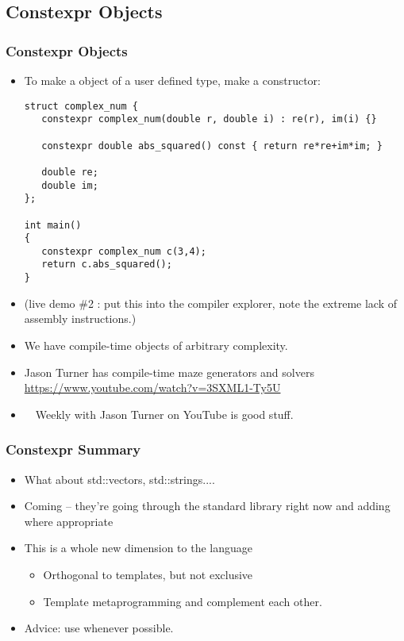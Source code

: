 \subsection{Constexpr Objects}
\begin{frame}[fragile,t]
\frametitle{Constexpr Objects}
\begin{itemize}[<+->]
\item To make a \cexpr object of a user defined type, make a 
  \cexpr constructor:
{\scriptsize\begin{Verbatim}
struct complex_num {
   constexpr complex_num(double r, double i) : re(r), im(i) {}

   constexpr double abs_squared() const { return re*re+im*im; }
  
   double re;
   double im;   
};

int main()
{
   constexpr complex_num c(3,4);
   return c.abs_squared();
}
\end{Verbatim}
}
\item (live demo \#2 : put this into the compiler explorer, note the
  extreme lack of assembly instructions.)
\item We have compile-time objects of arbitrary complexity.
\item Jason Turner has  compile-time maze generators and solvers \Emph{(!)}
\url{https://www.youtube.com/watch?v=3SXML1-Ty5U}
\item[] \ \CC\ Weekly with Jason Turner on YouTube is good stuff.
\end{itemize}
\end{frame}


\begin{frame}[fragile,t]
\frametitle{Constexpr Summary}
\begin{itemize}[<+->]
\item What about \cexpr std::vectors, std::strings....
\item Coming -- they're going through the standard library right now
  and adding \cexpr where appropriate
\item This is a whole new dimension to the language
\begin{itemize}
  \item Orthogonal to templates, but not exclusive
  \item Template metaprogramming and \cexpr complement each other.
\end{itemize}
\vskip 6pt
\item Advice: use \cexpr whenever possible.
\end{itemize}
\end{frame}
